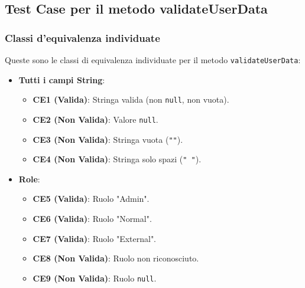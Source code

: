 \subsection{Test Case per il metodo validateUserData}
\subsubsection{Classi d'equivalenza individuate}
Queste sono le classi di equivalenza individuate per il metodo \texttt{validateUserData}:
\begin{itemize}
    \item \textbf{Tutti i campi String}:
    \begin{itemize}
        \item \textbf{CE1 (Valida)}: Stringa valida (non \texttt{null}, non vuota).
        \item \textbf{CE2 (Non Valida)}: Valore \texttt{null}.
        \item \textbf{CE3 (Non Valida)}: Stringa vuota (\texttt{""}).
        \item \textbf{CE4 (Non Valida)}: Stringa solo spazi (\texttt{" "}).
    \end{itemize}
    \item \textbf{Role}:
    \begin{itemize}
        \item \textbf{CE5 (Valida)}: Ruolo "Admin".
        \item \textbf{CE6 (Valida)}: Ruolo "Normal".
        \item \textbf{CE7 (Valida)}: Ruolo "External".
        \item \textbf{CE8 (Non Valida)}: Ruolo non riconosciuto.
        \item \textbf{CE9 (Non Valida)}: Ruolo \texttt{null}.
    \end{itemize}
\end{itemize}

\newpage
  


